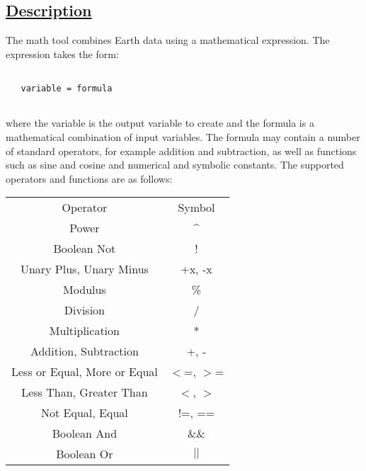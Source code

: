 \subsection*{\underline{Description}}


  The math tool combines Earth data using a mathematical expression. The expression takes the form:
\begin{verbatim}

   variable = formula
 
\end{verbatim}


 where the variable is the output variable to create and the formula is a mathematical combination of input variables. The formula may contain a number of standard operators, for example addition and subtraction, as well as functions such as sine and cosine and numerical and symbolic constants. The supported operators and functions are as follows:


\begin{tabular}{|c|c|}
\hline 
 & \\
 \hline 
Operator &Symbol \\
 \hline 
Power &\^{} \\
 \hline 
Boolean Not &! \\
 \hline 
Unary Plus, Unary Minus &+x, -x \\
 \hline 
Modulus &\% \\
 \hline 
Division &/ \\
 \hline 
Multiplication &* \\
 \hline 
Addition, Subtraction &+, - \\
 \hline 
Less or Equal, More or Equal &$<$=, $>$= \\
 \hline 
Less Than, Greater Than &$<$, $>$ \\
 \hline 
Not Equal, Equal &!=, == \\
 \hline 
Boolean And &\&\& \\
 \hline 
Boolean Or &$|$$|$ \\
 \hline 

\end{tabular}



